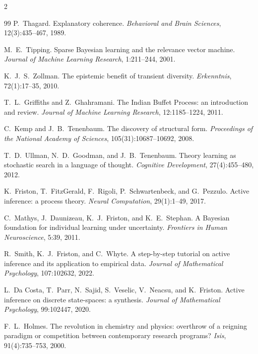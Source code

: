 \documentclass[11pt]{article}
\begin{document}
\begin{multicols}{2}
\begin{thebibliography}{99}
P.~Thagard.
Explanatory coherence. \emph{Behavioral and Brain Sciences}, 12(3):435--467, 1989.

M.~E.~Tipping.
Sparse Bayesian learning and the relevance vector machine.
\emph{Journal of Machine Learning Research}, 1:211--244, 2001.

K.~J.~S.~Zollman.
The epistemic benefit of transient diversity. \emph{Erkenntnis}, 72(1):17--35, 2010.

T.~L.~Griffiths and Z.~Ghahramani.
The Indian Buffet Process: an introduction and review.
\emph{Journal of Machine Learning Research}, 12:1185--1224, 2011.

C.~Kemp and J.~B.~Tenenbaum.
The discovery of structural form.
\emph{Proceedings of the National Academy of Sciences}, 105(31):10687--10692, 2008.

T.~D.~Ullman, N.~D.~Goodman, and J.~B.~Tenenbaum.
Theory learning as stochastic search in a language of thought.
\emph{Cognitive Development}, 27(4):455--480, 2012.

K.~Friston, T.~FitzGerald, F.~Rigoli, P.~Schwartenbeck, and G.~Pezzulo.
Active inference: a process theory. \emph{Neural Computation}, 29(1):1--49, 2017.

C.~Mathys, J.~Daunizeau, K.~J.~Friston, and K.~E.~Stephan.
A Bayesian foundation for individual learning under uncertainty.
\emph{Frontiers in Human Neuroscience}, 5:39, 2011.

R.~Smith, K.~J.~Friston, and C.~Whyte.
A step-by-step tutorial on active inference and its application to empirical data.
\emph{Journal of Mathematical Psychology}, 107:102632, 2022.

L.~Da Costa, T.~Parr, N.~Sajid, S.~Veselic, V.~Neacsu, and K.~Friston.
Active inference on discrete state-spaces: a synthesis.
\emph{Journal of Mathematical Psychology}, 99:102447, 2020.

F.~L.~Holmes.
The revolution in chemistry and physics: overthrow of a reigning paradigm or competition between
contemporary research programs? \emph{Isis}, 91(4):735--753, 2000.


\end{thebibliography}
\end{multicols}
\end{document}
